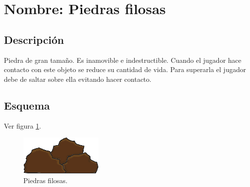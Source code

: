 		\section{Nombre: Piedras filosas}\label{obs.piedrasF}
	\subsection{Descripción}
	Piedra de gran tamaño. Es inamovible e indestructible. Cuando el jugador hace contacto con este objeto se reduce su cantidad de vida. Para superarla el jugador debe de saltar sobre ella evitando hacer contacto.
	\subsection{Esquema}
Ver figura \ref{fig:Piedras}.
\begin{figure}
	\centering
	\includegraphics[height=0.1 \textheight]{Imagenes/piedras01}
	\caption{Piedras filosas.}
	\label{fig:Piedras}
\end{figure}